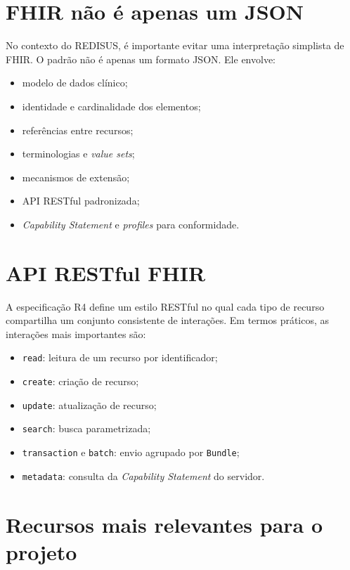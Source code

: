 \documentclass[
    12pt,
    openright,
    oneside,
    a4paper,
    chapter=TITLE,
    section=TITLE,
    brazil,
    sumario=tradicional,
    hidelinks
]{abntex2}
\begin{document}
\section{FHIR n\~ao \'e apenas um JSON}

No contexto do REDISUS, \'e importante evitar uma interpreta\c{c}\~ao simplista de FHIR. O padr\~ao n\~ao \'e apenas um formato JSON. Ele envolve:

\begin{itemize}
    \item modelo de dados cl\'inico;
    \item identidade e cardinalidade dos elementos;
    \item refer\^encias entre recursos;
    \item terminologias e \textit{value sets};
    \item mecanismos de extens\~ao;
    \item API RESTful padronizada;
    \item \textit{Capability Statement} e \textit{profiles} para conformidade.
\end{itemize}

\section{API RESTful FHIR}

A especifica\c{c}\~ao R4 define um estilo RESTful no qual cada tipo de recurso compartilha um conjunto consistente de intera\c{c}\~oes. Em termos pr\'aticos, as intera\c{c}\~oes mais importantes s\~ao:

\begin{itemize}
    \item \texttt{read}: leitura de um recurso por identificador;
    \item \texttt{create}: cria\c{c}\~ao de recurso;
    \item \texttt{update}: atualiza\c{c}\~ao de recurso;
    \item \texttt{search}: busca parametrizada;
    \item \texttt{transaction} e \texttt{batch}: envio agrupado por \texttt{Bundle};
    \item \texttt{metadata}: consulta da \textit{Capability Statement} do servidor.
\end{itemize}

\section{Recursos mais relevantes para o projeto}
\end{document}
